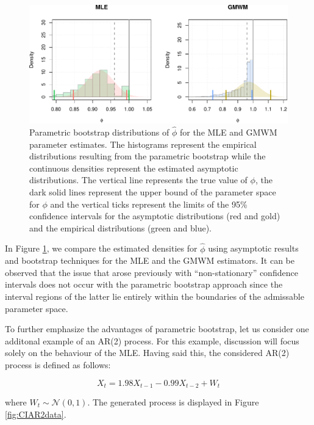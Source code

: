 \documentclass[]{book}
\theoremstyle{definition}
\theoremstyle{definition}
\theoremstyle{definition}
\theoremstyle{remark}
\begin{document}
\begin{figure}
\centering
\includegraphics{ts_files/figure-latex/paraAR1cigraphs-1.pdf}
\caption{\label{fig:paraAR1cigraphs}Parametric bootstrap distributions of
\(\hat{\phi}\) for the MLE and GMWM parameter estimates. The histograms
represent the empirical distributions resulting from the parametric
bootstrap while the continuous densities represent the estimated
asymptotic distributions. The vertical line represents the true value of
\(\phi\), the dark solid lines represent the upper bound of the
parameter space for \(\phi\) and the vertical ticks represent the limits
of the 95\% confidence intervals for the asymptotic distributions (red
and gold) and the empirical distributions (green and blue).}
\end{figure}

In Figure \ref{fig:paraAR1cigraphs}, we compare the estimated densities
for \(\hat{\phi}\) using asymptotic results and bootstrap techniques for
the MLE and the GMWM estimators. It can be observed that the issue that
arose previously with ``non-stationary'' confidence intervals does not
occur with the parametric bootstrap approach since the interval regions
of the latter lie entirely within the boundaries of the admissable
parameter space.

To further emphasize the advantages of parametric bootstrap, let us
consider one additonal example of an AR(2) process. For this example,
discussion will focus solely on the behaviour of the MLE. Having said
this, the considered AR(2) process is defined as follows:

\begin{equation}
{X_t} = {1.98}{X_{t - 1}} - {0.99}{X_{t - 2}} + {W_t}
\label{eq:ciar2}
\end{equation}

where \(W_t \sim \mathcal{N}(0, 1)\). The generated process is displayed
in Figure \ref{fig:CIAR2data}.
\end{document}
